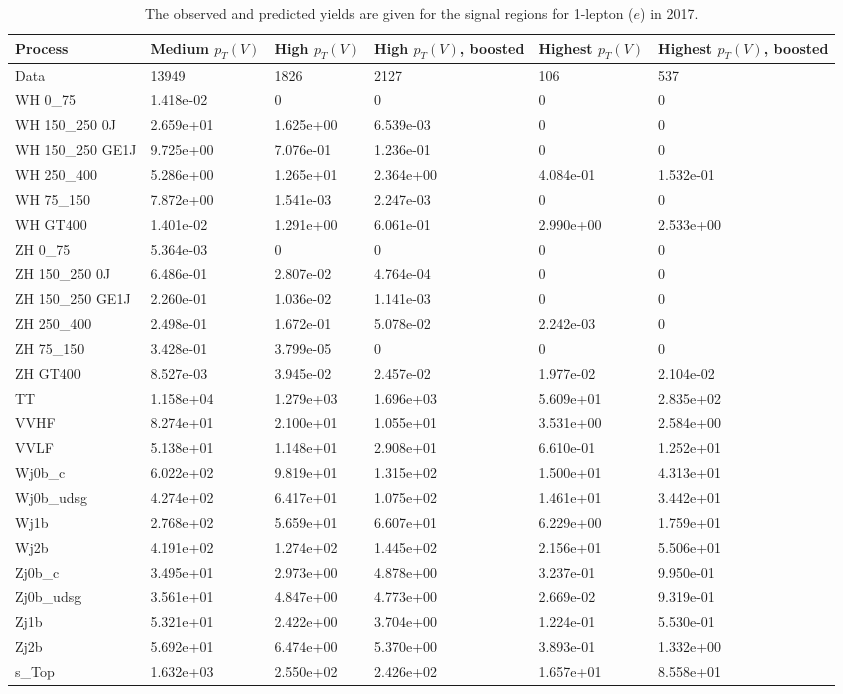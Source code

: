 \begin{table}
\centering
\caption[2017 1-lepton ($e$) signal selection yields]{
                  The observed and predicted yields are given for the
                  signal regions for 1-lepton ($e$) in 2017.
                  }
{\footnotesize
\begin{tabularx}{\textwidth}{|X|X|X|X|X|X|}
\hline
Process & Medium $p_{T}(V)$ & High $p_{T}(V)$ & High $p_{T}(V)$, boosted & Highest $p_{T}(V)$ & Highest $p_{T}(V)$, boosted \\
\hline
Data & 13949 & 1826 & 2127 & 106 & 537 \\
\hline
WH 0\_75 & 1.418e-02 & 0 & 0 & 0 & 0 \\
WH 150\_250 0J & 2.659e+01 & 1.625e+00 & 6.539e-03 & 0 & 0 \\
WH 150\_250 GE1J & 9.725e+00 & 7.076e-01 & 1.236e-01 & 0 & 0 \\
WH 250\_400 & 5.286e+00 & 1.265e+01 & 2.364e+00 & 4.084e-01 & 1.532e-01 \\
WH 75\_150 & 7.872e+00 & 1.541e-03 & 2.247e-03 & 0 & 0 \\
WH GT400 & 1.401e-02 & 1.291e+00 & 6.061e-01 & 2.990e+00 & 2.533e+00 \\
ZH 0\_75 & 5.364e-03 & 0 & 0 & 0 & 0 \\
ZH 150\_250 0J & 6.486e-01 & 2.807e-02 & 4.764e-04 & 0 & 0 \\
ZH 150\_250 GE1J & 2.260e-01 & 1.036e-02 & 1.141e-03 & 0 & 0 \\
ZH 250\_400 & 2.498e-01 & 1.672e-01 & 5.078e-02 & 2.242e-03 & 0 \\
ZH 75\_150 & 3.428e-01 & 3.799e-05 & 0 & 0 & 0 \\
ZH GT400 & 8.527e-03 & 3.945e-02 & 2.457e-02 & 1.977e-02 & 2.104e-02 \\
\hline
TT & 1.158e+04 & 1.279e+03 & 1.696e+03 & 5.609e+01 & 2.835e+02 \\
VVHF & 8.274e+01 & 2.100e+01 & 1.055e+01 & 3.531e+00 & 2.584e+00 \\
VVLF & 5.138e+01 & 1.148e+01 & 2.908e+01 & 6.610e-01 & 1.252e+01 \\
Wj0b\_c & 6.022e+02 & 9.819e+01 & 1.315e+02 & 1.500e+01 & 4.313e+01 \\
Wj0b\_udsg & 4.274e+02 & 6.417e+01 & 1.075e+02 & 1.461e+01 & 3.442e+01 \\
Wj1b & 2.768e+02 & 5.659e+01 & 6.607e+01 & 6.229e+00 & 1.759e+01 \\
Wj2b & 4.191e+02 & 1.274e+02 & 1.445e+02 & 2.156e+01 & 5.506e+01 \\
Zj0b\_c & 3.495e+01 & 2.973e+00 & 4.878e+00 & 3.237e-01 & 9.950e-01 \\
Zj0b\_udsg & 3.561e+01 & 4.847e+00 & 4.773e+00 & 2.669e-02 & 9.319e-01 \\
Zj1b & 5.321e+01 & 2.422e+00 & 3.704e+00 & 1.224e-01 & 5.530e-01 \\
Zj2b & 5.692e+01 & 6.474e+00 & 5.370e+00 & 3.893e-01 & 1.332e+00 \\
s\_Top & 1.632e+03 & 2.550e+02 & 2.426e+02 & 1.657e+01 & 8.558e+01 \\
\hline
\end{tabularx}
}
\label{tab:sr-Wen-2017}
\end{table}

